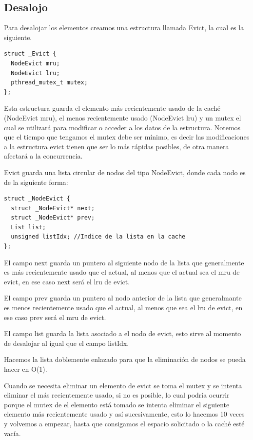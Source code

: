 \documentclass{article}
\begin{document}
\subsection{Desalojo}
Para desalojar los elementos creamos una estructura llamada
Evict, la cual es la siguiente.

\begin{lstlisting}[style=CStyle]
struct _Evict {  
  NodeEvict mru;
  NodeEvict lru;
  pthread_mutex_t mutex;  
};
\end{lstlisting}

Esta estructura guarda el elemento más recientemente
usado de la caché (NodeEvict mru), el menos
recientemente usado (NodeEvict lru) y un mutex el cual
se utilizará para modificar o acceder a los datos de
la estructura. Notemos que el tiempo que tengamos el
mutex debe ser mínimo, es decir las modificaciones a 
la estructura evict tienen que ser lo más rápidas
posibles, de otra manera afectará a la concurrencia.

Evict guarda una lista circular de nodos del tipo
NodeEvict, donde cada nodo es de la siguiente forma:

\begin{lstlisting}[style=CStyle]
struct _NodeEvict {
  struct _NodeEvict* next;
  struct _NodeEvict* prev;
  List list;
  unsigned listIdx; //Indice de la lista en la cache
};
\end{lstlisting}

El campo next guarda un puntero al siguiente nodo de
la lista que generalmente es más recientemente usado
que el actual, al menos que el actual sea el mru de
evict, en ese caso next será el lru de evict.

El campo prev guarda un puntero al nodo anterior de la
lista que generalmante es menos recientemente usado
que el actual, al menos que sea el lru de evict, en ese
caso prev será el mru de evict.

El campo list guarda la lista asociado a el nodo de
evict, esto sirve al momento de desalojar al igual
que el campo listIdx.

Hacemos la lista doblemente enlazado para que la
eliminación de nodos se pueda hacer en O(1).

Cuando se necesita eliminar un elemento de evict
se toma el mutex y se intenta eliminar el más recientemente
usado, si no es posible, lo cual podría ocurrir porque
el mutex de el elemento está tomado se intenta eliminar el 
siguiente elemento más recientemente usado y así sucesivamente,
esto lo hacemos 10 veces y volvemos a empezar, hasta que
consigamos el espacio solicitado o la caché esté vacía.
\end{document}
